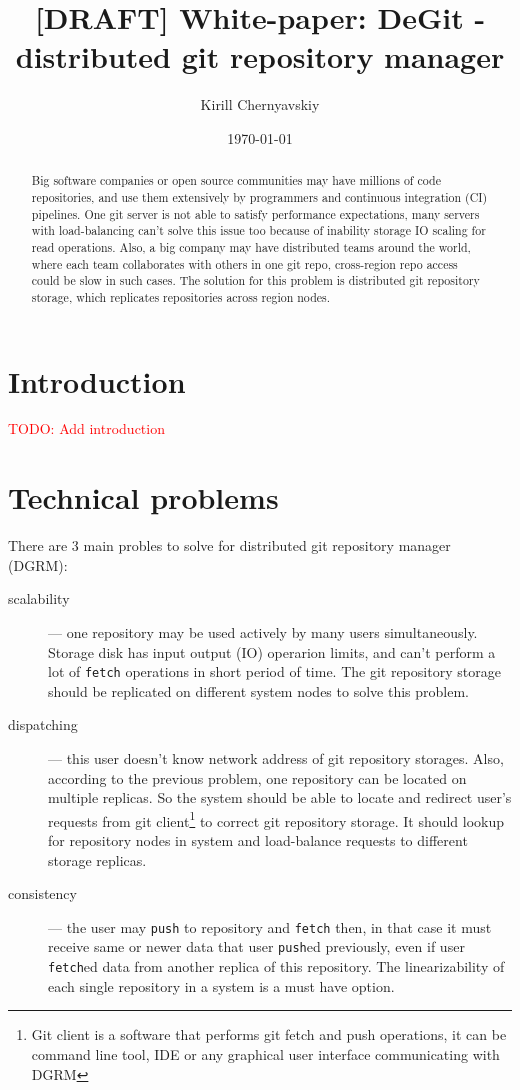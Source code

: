 \documentclass[acmlarge, screen, nonacm]{acmart}
\date{\small\today}
\title[DeGit white paper]{[DRAFT] White-paper: DeGit - distributed git repository manager}
\author{Kirill Chernyavskiy}
\newcommand{\code}[1]{\texttt{#1}}
\newcommand{\todo}[1]{\textcolor{red}{TODO: #1}}
\begin{document}
\raggedbottom

\begin{abstract}
  Big software companies or open source communities 
  may have millions of code repositories,
  and use them extensively by programmers and continuous integration (CI) pipelines.
  One git server is not able to satisfy performance expectations,
  many servers with load-balancing can't solve this issue too because
  of inability storage IO scaling for read operations.
  Also, a big company may have distributed teams around the world,
  where each team collaborates with others in one git repo,
  cross-region repo access could be slow in such cases.
  The solution for this problem is distributed git repository storage,
  which replicates repositories across region nodes.
\end{abstract}

\maketitle

\section{Introduction}

\todo{Add introduction}

\section{Technical problems}


There are 3 main probles to solve for distributed git repository manager (DGRM):
\begin{description}
\item[scalability] --- one repository may be used actively by many users simultaneously. Storage disk
  has input output (IO) operarion limits, and can't perform a lot of \code{fetch} operations in
  short period of time. The git repository storage should be replicated on different system nodes to
  solve this problem.
\item[dispatching] --- this user doesn't know network address of git repository storages. Also, according to the
  previous problem, one repository can be located on multiple replicas.
  So the system should be able to locate and redirect user's requests
  from git client\footnote{Git client is a software that performs git fetch and push operations, it can be
  command line tool, IDE or any graphical user interface communicating with DGRM} to correct git repository
  storage. It should lookup for repository nodes in system and load-balance requests to different storage replicas.
\item[consistency] --- the user may \code{push} to repository and \code{fetch} then, in that case it must receive
  same or newer data that user \code{push}ed previously, even if user \code{fetch}ed data from another
  replica of this repository. The linearizability of each single repository in a system is a must have option.
\end{description}
\end{document}
